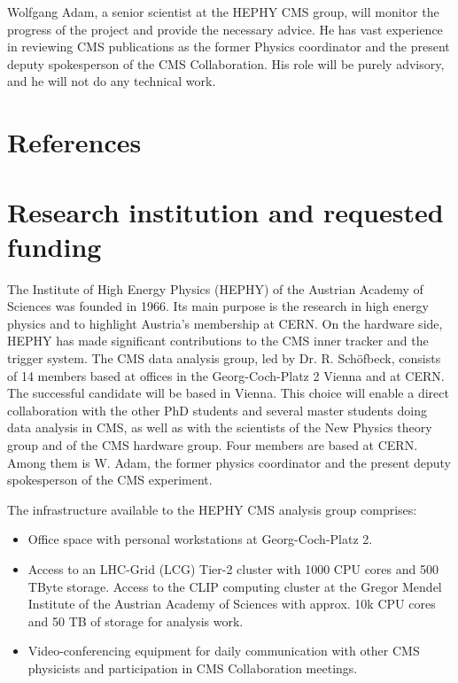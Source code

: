 \documentclass[a4paper,11pt]{article}
\begin{document}
Wolfgang Adam, a senior scientist at the HEPHY CMS group, will monitor the progress of the project and provide the necessary advice. He has vast experience in reviewing CMS publications as the former Physics coordinator and the present deputy spokesperson of the CMS Collaboration. His role will be purely advisory, and he will not do any technical work.

\appendix
\renewcommand{\thesection}{Annex \arabic{section}} 

\clearpage
\section{References}
\renewcommand{\refname}{}
{
%


}

\newpage

\section{Research institution and requested funding}

The Institute of High Energy Physics (HEPHY) of the Austrian Academy of Sciences was founded in 1966. 
Its main purpose is the research in high energy physics and to highlight Austria's membership at CERN. 
On the hardware side, HEPHY has made significant contributions to the CMS inner tracker and the trigger system. 
The CMS data analysis group, led by Dr. R. Sch{\"o}fbeck, consists of 14 members based at offices in the Georg-Coch-Platz 2 Vienna and at CERN. The successful candidate will be based in Vienna. 
This choice will enable a direct collaboration with the other PhD students and several master students doing data analysis in CMS, as well as with the scientists of the New Physics theory group and of the CMS hardware group.
Four members are based at CERN. 
Among them is  W. Adam, the former physics coordinator and the present deputy spokesperson of the CMS experiment.

The infrastructure available to the HEPHY CMS analysis group comprises:
\begin{itemize}
\item Office space with personal workstations at Georg-Coch-Platz 2.
\item Access to an LHC-Grid (LCG) Tier-2 cluster with 1000 CPU cores and 500 TByte storage. Access to the CLIP computing cluster at the Gregor Mendel Institute of the Austrian Academy of Sciences with approx. 10k CPU cores and 50 TB of
storage for analysis work.
\item Video-conferencing equipment for daily communication with other CMS physicists and participation in CMS Collaboration meetings.
\end{itemize}
\end{document}
